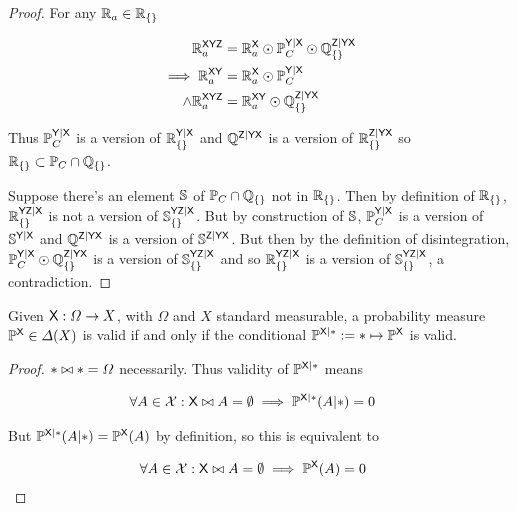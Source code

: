\begin{proof}
For any $\mathbb{R}_a\in\mathbb{R}_{\{\}}$

\begin{align}
    \mathbb{R}_{a}^{\mathsf{XYZ}} &= \mathbb{R}_a^{\mathsf{X}}\odot \mathbb{P}_C^{\mathsf{Y}|\mathsf{X}}\odot \mathbb{Q}_{\{\}}^{\mathsf{Z}|\mathsf{YX}}\\
    \implies \mathbb{R}_{a}^{\mathsf{XY}} &= \mathbb{R}_a^{\mathsf{X}}\odot \mathbb{P}_C^{\mathsf{Y}|\mathsf{X}}\\
    \land \mathbb{R}_{a}^{\mathsf{XYZ}} &= \mathbb{R}_{a}^{\mathsf{XY}}\odot \mathbb{Q}_{\{\}}^{\mathsf{Z}|\mathsf{YX}}
\end{align}

Thus $\mathbb{P}_C^{\mathsf{Y}|\mathsf{X}}$ is a version of $\mathbb{R}_{\{\}}^{\mathsf{Y}|\mathsf{X}}$ and $\mathbb{Q}^{\mathsf{Z}|\mathsf{YX}}$ is a version of $\mathbb{R}_{\{\}}^{\mathsf{Z}|\mathsf{YX}}$ so $\mathbb{R}_{\{\}}\subset \mathbb{P}_C\cap\mathbb{Q}_{\{\}}$.

Suppose there's an element $\mathbb{S}$ of $\mathbb{P}_C\cap\mathbb{Q}_{\{\}}$ not in $\mathbb{R}_{\{\}}$. Then by definition of $\mathbb{R}_{\{\}}$, $\mathbb{R}_{\{\}}^{\mathsf{YZ}|\mathsf{X}}$ is not a version of $\mathbb{S}_{\{\}}^{\mathsf{YZ}|\mathsf{X}}$. But by construction of $\mathbb{S}$, $\mathbb{P}_C^{\mathsf{Y}|\mathsf{X}}$  is a version of $\mathbb{S}^{\mathsf{Y}|\mathsf{X}}$ and  $\mathbb{Q}^{\mathsf{Z}|\mathsf{YX}}$ is a version of $\mathbb{S}^{\mathsf{Z}|\mathsf{YX}}$. But then by the definition of disintegration, $\mathbb{P}_C^{\mathsf{Y}|\mathsf{X}} \odot \mathbb{Q}_{\{\}}^{\mathsf{Z}|\mathsf{YX}}$ is a version of $\mathbb{S}_{\{\}}^{\mathsf{YZ}|\mathsf{X}}$ and so $\mathbb{R}_{\{\}}^{\mathsf{YZ}|\mathsf{X}}$ is a version of $\mathbb{S}_{\{\}}^{\mathsf{YZ}|\mathsf{X}}$, a contradiction.
\end{proof}


\begin{lemma}\label{th:valid_agree}
Given $\mathsf{X}:\Omega\to X$, with $\Omega$ and $X$ standard measurable, a probability measure $\mathbb{P}^{\mathsf{X}}\in \Delta(X)$ is valid if and only if the conditional $\mathbb{P}^{\mathsf{X}|*}:=*\mapsto \mathbb{P}^{\mathsf{X}}$ is valid.
\end{lemma}

\begin{proof}
$*\bowtie *=\Omega$ necessarily. Thus validity of $\mathbb{P}^{\mathsf{X}|*}$ means 

\begin{align}
    \forall A\in \mathcal{X}: \mathsf{X}\bowtie A=\emptyset \implies \mathbb{P}^{\mathsf{X}|*}(A|*)&=0
\end{align}

But $\mathbb{P}^{\mathsf{X}|*}(A|*)=\mathbb{P}^{\mathsf{X}}(A)$ by definition, so this is equivalent to

\begin{align}
    \forall A\in \mathcal{X}: \mathsf{X}\bowtie A=\emptyset \implies \mathbb{P}^{\mathsf{X}}(A)&=0
\end{align}
\end{proof}


